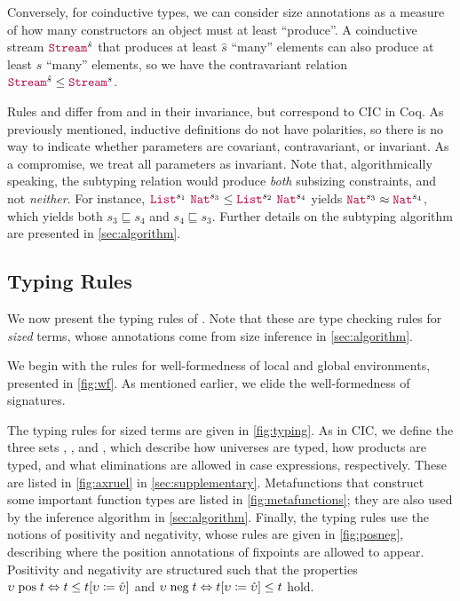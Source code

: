 Conversely, for coinductive types, we can consider size annotations as a measure of how many constructors an object must at least ``produce''. A coinductive stream $\Stream^{\hat{s}}$ that produces at least $\hat{s}$ ``many'' elements can also produce at least $s$ ``many'' elements, so we have the contravariant relation $\Stream^{\hat{s}} \leq \Stream^s$.

Rules  and  differ from \CIChat and \CIChatminus in their invariance, but correspond to CIC in Coq.
As previously mentioned, inductive definitions do not have polarities, so there is no way to indicate whether parameters are covariant, contravariant, or invariant.
As a compromise, we treat all parameters as invariant.
Note that, algorithmically speaking, the subtyping relation would produce \textit{both} subsizing constraints, and not \textit{neither}. For instance, $\List^{s_1} ~ \Nat^{s_3} \leq \List^{s_2} ~ \Nat^{s_4}$ yields $\Nat^{s_3} \approx \Nat^{s_4}$, which yields both $s_3 \sqsubseteq s_4$ and $s_4 \sqsubseteq s_3$.
Further details on the subtyping algorithm are presented in \autoref{sec:algorithm}.

\subsection{Typing Rules}\label{sec:typing:rules}

We now present the typing rules of \lang.
Note that these are type checking rules for \textit{sized} terms, whose annotations come from size inference in \autoref{sec:algorithm}.



We begin with the rules for well-formedness of local and global environments, presented in \autoref{fig:wf}.
As mentioned earlier, we elide the well-formedness of signatures.







The typing rules for sized terms are given in \autoref{fig:typing}. As in CIC, we define the three sets \Axioms, \Rules, and \Elims, which describe how universes are typed, how products are typed, and what eliminations are allowed in case expressions, respectively.
These are listed in \autoref{fig:axruel} in \autoref{sec:supplementary}.
Metafunctions that construct some important function types are listed in \autoref{fig:metafunctions}; they are also used by the inference algorithm in \autoref{sec:algorithm}.
Finally, the typing rules use the notions of positivity and negativity, whose rules are given in \autoref{fig:posneg}, describing where the position annotations of fixpoints are allowed to appear.
Positivity and negativity are structured such that the properties $\upsilon \mathrel{\text{pos}} t \Leftrightarrow t \leq t [\upsilon \coloneqq \hat{\upsilon}]$ and $\upsilon \mathrel{\text{neg}} t \Leftrightarrow t [\upsilon \coloneqq \hat{\upsilon}] \leq t$ hold.

